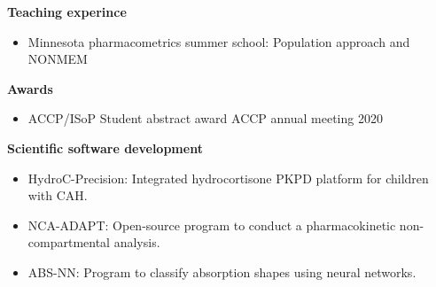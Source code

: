 \documentclass[a4paper,11pt]{article}
\begin{document}
\textbf{Teaching experince} \\
\begin{itemize}
\item Minnesota pharmacometrics summer school: Population approach and NONMEM 
\end{itemize}

\textbf{Awards} \\
\begin{itemize}
\item ACCP/ISoP Student abstract award \hfill ACCP annual meeting 2020
\end{itemize}

\textbf{Scientific software development} \\
\begin{itemize}
\item HydroC-Precision: Integrated hydrocortisone PKPD platform for children with CAH.
\item NCA-ADAPT: Open-source program to conduct a pharmacokinetic non-compartmental analysis. 
\item ABS-NN: Program to classify absorption shapes using neural networks. 
\end{itemize}
\nocite{*}
\printbibliography[title=Publications, keyword=papers]

\printbibliography[title=Posters \& abstracts,keyword=poster]
\end{document}
